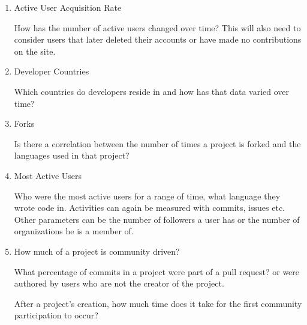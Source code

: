 \begin{enumerate}
    \item Active User Acquisition Rate

        How has the number of active users changed over time? This will also need to consider users that later deleted their accounts or have made no contributions on the site.

    
    \item Developer Countries
    
        Which countries do developers reside in and how has that data varied over time?
        
    \item Forks
        
        Is there a correlation between the number of times a project is forked and the languages used in that project?
    
    \item Most Active Users
    
        Who were the most active users for a range of time, what language they wrote code in.
        Activities can again be measured with commits, issues etc. \\
        Other parameters can be the number of followers a user has or the number of organizations he is a member of.
    
    \item How much of a project is community driven?
        
        What percentage of commits in a project were part of a pull request?
        or were authored by users who are not the creator of the project.
        
        After a project's creation, how much time does it take for the first community participation to occur?
        
\end{enumerate}
